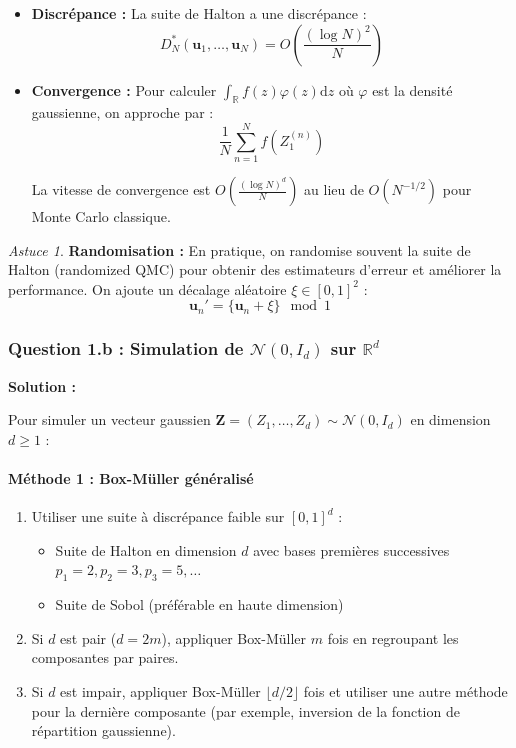 \documentclass[12pt,a4paper]{article}
\theoremstyle{definition}
\theoremstyle{remark}
\newtheorem*{astuce}{Astuce}
\newcommand{\R}{\mathbb{R}}
\newcommand{\dd}{\mathrm{d}}
\begin{document}
\begin{itemize}
\item \textbf{Discrépance :} La suite de Halton a une discrépance :
\[
D_N^*(\mathbf{u}_1, \ldots, \mathbf{u}_N) = O\left(\frac{(\log N)^2}{N}\right)
\]

\item \textbf{Convergence :} Pour calculer $\int_{\R} f(z)\varphi(z)\dd z$ où $\varphi$ est la densité gaussienne, on approche par :
\[
\frac{1}{N}\sum_{n=1}^N f(Z_1^{(n)})
\]

La vitesse de convergence est $O\left(\frac{(\log N)^d}{N}\right)$ au lieu de $O(N^{-1/2})$ pour Monte Carlo classique.
\end{itemize}

\begin{astuce}
\textbf{Randomisation :} En pratique, on randomise souvent la suite de Halton (randomized QMC) pour obtenir des estimateurs d'erreur et améliorer la performance. On ajoute un décalage aléatoire $\xi \in [0,1]^2$ :
\[
\mathbf{u}_n' = \{\mathbf{u}_n + \xi\} \mod 1
\]
\end{astuce}

\subsubsection{Question 1.b : Simulation de $\mathcal{N}(0, I_d)$ sur $\R^d$}

\textbf{Solution :}

Pour simuler un vecteur gaussien $\mathbf{Z} = (Z_1, \ldots, Z_d) \sim \mathcal{N}(0, I_d)$ en dimension $d \geq 1$ :

\paragraph{Méthode 1 : Box-Müller généralisé}

\begin{enumerate}
\item Utiliser une suite à discrépance faible sur $[0,1]^d$ :
\begin{itemize}
\item Suite de Halton en dimension $d$ avec bases premières successives $p_1 = 2, p_2 = 3, p_3 = 5, \ldots$
\item Suite de Sobol (préférable en haute dimension)
\end{itemize}

\item Si $d$ est pair ($d = 2m$), appliquer Box-Müller $m$ fois en regroupant les composantes par paires.

\item Si $d$ est impair, appliquer Box-Müller $\lfloor d/2 \rfloor$ fois et utiliser une autre méthode pour la dernière composante (par exemple, inversion de la fonction de répartition gaussienne).
\end{enumerate}
\end{document}
